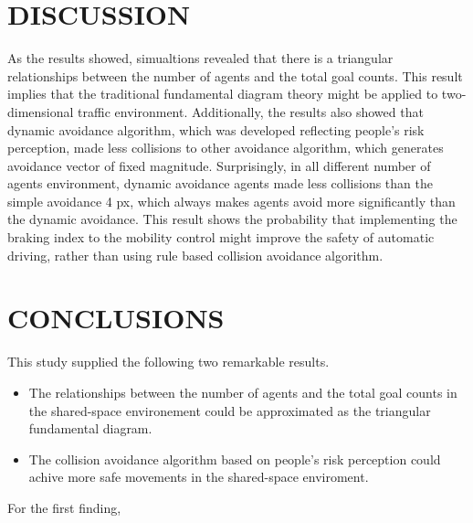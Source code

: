 \documentclass[letterpaper, 10 pt, conference]{ieeeconf}  %
\begin{document}

\section{DISCUSSION}
As the results showed, simualtions revealed that there is a triangular relationships between the number of agents and the total goal counts. This result implies that the traditional fundamental diagram theory might be applied to two-dimensional traffic environment. Additionally, the results also showed that dynamic avoidance algorithm, which was developed reflecting people's risk perception, made less collisions to other avoidance algorithm, which generates avoidance vector of fixed magnitude. Surprisingly, in all different number of agents environment, dynamic avoidance agents made less collisions than the simple avoidance 4 px, which always makes agents avoid more significantly than the dynamic avoidance. This result shows the probability that implementing the braking index to the mobility control might improve the safety of automatic driving, rather than using rule based collision avoidance algorithm. 

\section{CONCLUSIONS}
This study supplied the following two remarkable results.

\begin{itemize}
\item The relationships between the number of agents and the total goal counts in the shared-space environement could be approximated as the triangular fundamental diagram.
\item The collision avoidance algorithm based on people's risk perception could achive more safe movements in the shared-space enviroment.
\end{itemize}

For the first finding, 

\addtolength{\textheight}{-12cm}  
\end{document}
